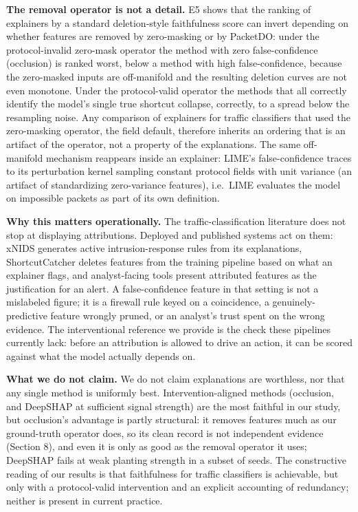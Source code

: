 \documentclass[journal]{IEEEtran}
\begin{document}
\textbf{The removal operator is not a detail.} E5 shows that the ranking
of explainers by a standard deletion-style faithfulness score can invert
depending on whether features are removed by zero-masking or by
PacketDO: under the protocol-invalid zero-mask operator the method with
zero false-confidence (occlusion) is ranked worst, below a method with
high false-confidence, because the zero-masked inputs are off-manifold
and the resulting deletion curves are not even monotone. Under the
protocol-valid operator the methods that all correctly identify the
model's single true shortcut collapse, correctly, to a spread below the
resampling noise. Any comparison of explainers for traffic classifiers
that used the zero-masking operator, the field default, therefore
inherits an ordering that is an artifact of the operator, not a property
of the explanations. The same off-manifold mechanism reappears inside an
explainer: LIME's false-confidence traces to its perturbation kernel
sampling constant protocol fields with unit variance (an artifact of
standardizing zero-variance features), i.e.~LIME evaluates the model on
impossible packets as part of its own definition.

\textbf{Why this matters operationally.} The traffic-classification
literature does not stop at displaying attributions. Deployed and
published systems act on them: xNIDS \cite{wei2023xnids} generates
active intrusion-response rules from its explanations, ShortcutCatcher
\cite{zhao2026shortcutcatcher} deletes features from the training
pipeline based on what an explainer flags, and analyst-facing tools
present attributed features as the justification for an alert. A
false-confidence feature in that setting is not a mislabeled figure; it
is a firewall rule keyed on a coincidence, a genuinely-predictive
feature wrongly pruned, or an analyst's trust spent on the wrong
evidence. The interventional reference we provide is the check these
pipelines currently lack: before an attribution is allowed to drive an
action, it can be scored against what the model actually depends on.

\textbf{What we do not claim.} We do not claim explanations are
worthless, nor that any single method is uniformly best.
Intervention-aligned methods (occlusion, and DeepSHAP at sufficient
signal strength) are the most faithful in our study, but occlusion's
advantage is partly structural: it removes features much as our
ground-truth operator does, so its clean record is not independent
evidence (Section 8), and even it is only as good as the removal
operator it uses; DeepSHAP fails at weak planting strength in a subset
of seeds. The constructive reading of our results is that faithfulness
for traffic classifiers is achievable, but only with a protocol-valid
intervention and an explicit accounting of redundancy; neither is
present in current practice.
\end{document}

